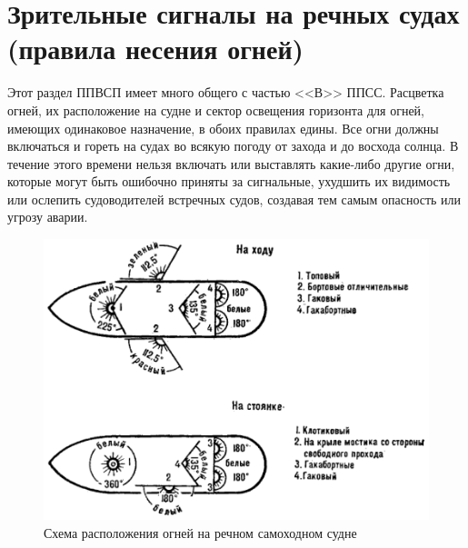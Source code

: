 \documentclass[a4paper, 12pt, twoside, final]{scrbook}
\begin{document}
\section{Зрительные сигналы на речных судах (правила несения огней)}

Этот раздел ППВСП имеет много общего с частью <<В>> ППСС. Расцветка огней, их расположение на судне и сектор освещения горизонта для огней, имеющих одинаковое назначение, в обоих правилах едины. Все огни должны включаться и гореть на судах во всякую погоду от захода и до восхода солнца. В течение этого времени нельзя включать или выставлять какие-либо другие огни, которые могут быть ошибочно приняты за сигнальные, ухудшить их видимость или ослепить судоводителей встречных судов, создавая тем самым опасность или угрозу аварии.

\begin{figure}[htbp]
   \centering
   \includegraphics{pics/143_Shema_rasp_ognej} %
   \caption{Схема расположения огней на речном самоходном судне}
   \label{fig:143}
\end{figure}
\end{document}
